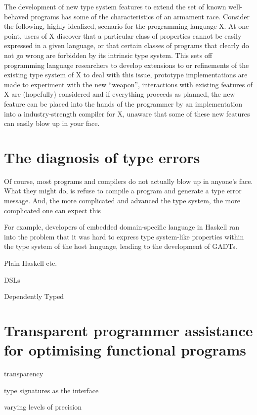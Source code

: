 \documentclass[sigplan,10pt,noacm]{acmart}
\begin{document}
The development of new type system features to extend the set of known
well-behaved programs has some of the characteristics of an armament race.
Consider the following, highly idealized, scenario for the programming
language X.
At one point, users of X discover that a particular class of 
properties cannot be easily expressed in a given language, or that certain classes of programs that
clearly do not go wrong are forbidden by its intrinsic type system.
This sets off programming language researchers to develop extensions to or
refinements of the existing type system of X to deal with this issue,
prototype implementations are made to experiment with the new ``weapon'',
interactions with existing features of X are (hopefully) considered and
if everything proceeds as planned, the new feature can be placed into the
hands of the programmer by an implementation into a industry-strength compiler
for X, unaware that some of these new features can easily blow up in 
your face.

\section{The diagnosis of type errors}

Of course, most programs and compilers do not actually blow up in anyone's face.
What they might do, is refuse to compile a program and generate a type error
message. And, the more complicated and advanced the type system, the more
complicated one can expect this  

For example, developers of embedded domain-specific language in Haskell ran 
into the problem that it was hard to express type system-like properties within 
the type system of the host language, leading to the development of GADTs. 

Plain Haskell etc.

DSLs

Dependently Typed

\section{Transparent programmer assistance for optimising functional programs}

transparency

type signatures as the interface

varying levels of precision
\end{document}
